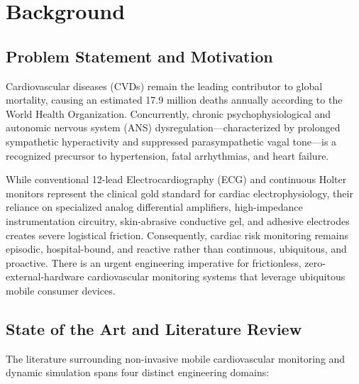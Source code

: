 \documentclass[11pt,a4paper]{article}
\begin{document}
\section{Background}

\subsection{Problem Statement and Motivation}
Cardiovascular diseases (CVDs) remain the leading contributor to global mortality, causing an estimated 17.9 million deaths annually according to the World Health Organization. Concurrently, chronic psychophysiological and autonomic nervous system (ANS) dysregulation---characterized by prolonged sympathetic hyperactivity and suppressed parasympathetic vagal tone---is a recognized precursor to hypertension, fatal arrhythmias, and heart failure. 

While conventional 12-lead Electrocardiography (ECG) and continuous Holter monitors represent the clinical gold standard for cardiac electrophysiology, their reliance on specialized analog differential amplifiers, high-impedance instrumentation circuitry, skin-abrasive conductive gel, and adhesive electrodes creates severe logistical friction. Consequently, cardiac risk monitoring remains episodic, hospital-bound, and reactive rather than continuous, ubiquitous, and proactive. There is an urgent engineering imperative for frictionless, zero-external-hardware cardiovascular monitoring systems that leverage ubiquitous mobile consumer devices.

\subsection{State of the Art and Literature Review}
The literature surrounding non-invasive mobile cardiovascular monitoring and dynamic simulation spans four distinct engineering domains:
\end{document}
